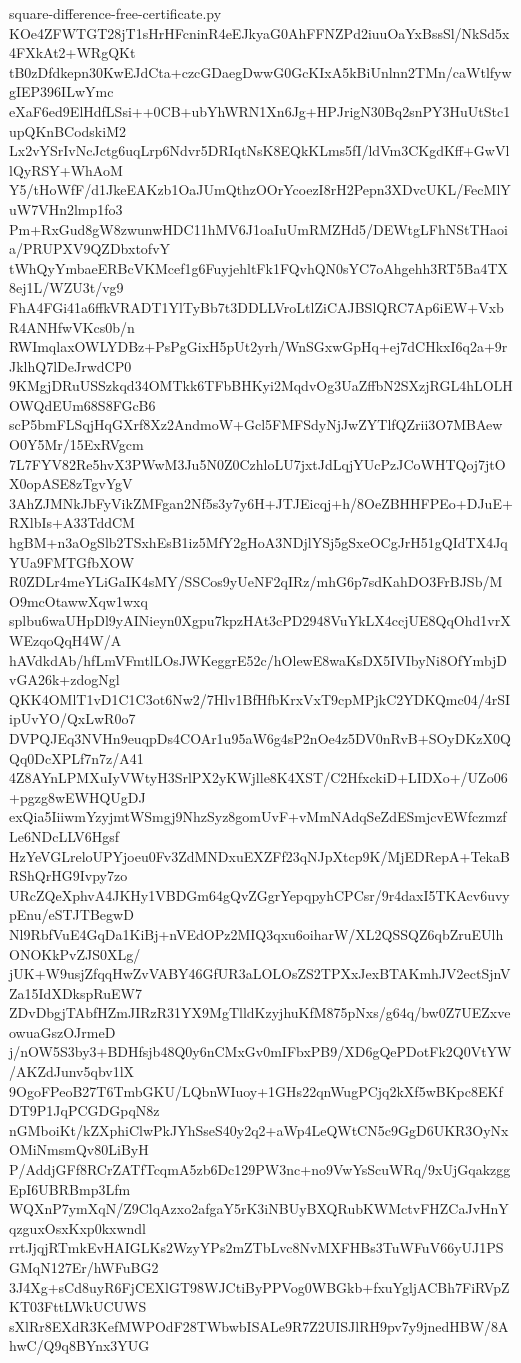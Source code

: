 \documentclass[11pt]{article}
\theoremstyle{definition}
\theoremstyle{remark}
\begin{document}
\begin{filecontents*}[overwrite]{square-difference-free-certificate.py}
KOe4ZFWTGT28jT1sHrHFcninR4eEJkyaG0AhFFNZPd2iuuOaYxBssSl/NkSd5x4FXkAt2+WRgQKt
tB0zDfdkepn30KwEJdCta+czcGDaegDwwG0GcKIxA5kBiUnlnn2TMn/caWtlfywgIEP396ILwYmc
eXaF6ed9ElHdfLSsi++0CB+ubYhWRN1Xn6Jg+HPJrigN30Bq2snPY3HuUtStc1upQKnBCodskiM2
Lx2vYSrIvNcJctg6uqLrp6Ndvr5DRIqtNsK8EQkKLms5fI/ldVm3CKgdKff+GwVllQyRSY+WhAoM
Y5/tHoWfF/d1JkeEAKzb1OaJUmQthzOOrYcoezI8rH2Pepn3XDvcUKL/FecMlYuW7VHn2lmp1fo3
Pm+RxGud8gW8zwunwHDC11hMV6J1oaIuUmRMZHd5/DEWtgLFhNStTHaoia/PRUPXV9QZDbxtofvY
tWhQyYmbaeERBcVKMcef1g6FuyjehltFk1FQvhQN0sYC7oAhgehh3RT5Ba4TX8ej1L/WZU3t/vg9
FhA4FGi41a6ffkVRADT1YlTyBb7t3DDLLVroLtlZiCAJBSlQRC7Ap6iEW+VxbR4ANHfwVKcs0b/n
RWImqlaxOWLYDBz+PsPgGixH5pUt2yrh/WnSGxwGpHq+ej7dCHkxI6q2a+9rJklhQ7lDeJrwdCP0
9KMgjDRuUSSzkqd34OMTkk6TFbBHKyi2MqdvOg3UaZffbN2SXzjRGL4hLOLHOWQdEUm68S8FGcB6
scP5bmFLSqjHqGXrf8Xz2AndmoW+Gcl5FMFSdyNjJwZYTlfQZrii3O7MBAewO0Y5Mr/15ExRVgcm
7L7FYV82Re5hvX3PWwM3Ju5N0Z0CzhloLU7jxtJdLqjYUcPzJCoWHTQoj7jtOX0opASE8zTgvYgV
3AhZJMNkJbFyVikZMFgan2Nf5s3y7y6H+JTJEicqj+h/8OeZBHHFPEo+DJuE+RXlbIs+A33TddCM
hgBM+n3aOgSlb2TSxhEsB1iz5MfY2gHoA3NDjlYSj5gSxeOCgJrH51gQIdTX4JqYUa9FMTGfbXOW
R0ZDLr4meYLiGaIK4sMY/SSCos9yUeNF2qIRz/mhG6p7sdKahDO3FrBJSb/MO9mcOtawwXqw1wxq
splbu6waUHpDl9yAINieyn0Xgpu7kpzHAt3cPD2948VuYkLX4ccjUE8QqOhd1vrXWEzqoQqH4W/A
hAVdkdAb/hfLmVFmtlLOsJWKeggrE52c/hOlewE8waKsDX5IVIbyNi8OfYmbjDvGA26k+zdogNgl
QKK4OMlT1vD1C1C3ot6Nw2/7Hlv1BfHfbKrxVxT9cpMPjkC2YDKQmc04/4rSIipUvYO/QxLwR0o7
DVPQJEq3NVHn9euqpDs4COAr1u95aW6g4sP2nOe4z5DV0nRvB+SOyDKzX0QQq0DcXPLf7n7z/A41
4Z8AYnLPMXuIyVWtyH3SrlPX2yKWjlle8K4XST/C2HfxckiD+LIDXo+/UZo06+pgzg8wEWHQUgDJ
exQia5IiiwmYzyjmtWSmgj9NhzSyz8gomUvF+vMmNAdqSeZdESmjcvEWfczmzfLe6NDcLLV6Hgsf
HzYeVGLreloUPYjoeu0Fv3ZdMNDxuEXZFf23qNJpXtcp9K/MjEDRepA+TekaBRShQrHG9Ivpy7zo
URcZQeXphvA4JKHy1VBDGm64gQvZGgrYepqpyhCPCsr/9r4daxI5TKAcv6uvypEnu/eSTJTBegwD
Nl9RbfVuE4GqDa1KiBj+nVEdOPz2MIQ3qxu6oiharW/XL2QSSQZ6qbZruEUlhONOKkPvZJS0XLg/
jUK+W9usjZfqqHwZvVABY46GfUR3aLOLOsZS2TPXxJexBTAKmhJV2ectSjnVZa15IdXDkspRuEW7
ZDvDbgjTAbfHZmJIRzR31YX9MgTlldKzyjhuKfM875pNxs/g64q/bw0Z7UEZxveowuaGszOJrmeD
j/nOW5S3by3+BDHfsjb48Q0y6nCMxGv0mIFbxPB9/XD6gQePDotFk2Q0VtYW/AKZdJunv5qbv1lX
9OgoFPeoB27T6TmbGKU/LQbnWIuoy+1GHs22qnWugPCjq2kXf5wBKpc8EKfDT9P1JqPCGDGpqN8z
nGMboiKt/kZXphiClwPkJYhSseS40y2q2+aWp4LeQWtCN5c9GgD6UKR3OyNxOMiNmsmQv80LiByH
P/AddjGFf8RCrZATfTcqmA5zb6Dc129PW3nc+no9VwYsScuWRq/9xUjGqakzggEpI6UBRBmp3Lfm
WQXnP7ymXqN/Z9ClqAzxo2afgaY5rK3iNBUyBXQRubKWMctvFHZCaJvHnYqzguxOsxKxp0kxwndl
rrtJjqjRTmkEvHAIGLKs2WzyYPs2mZTbLvc8NvMXFHBs3TuWFuV66yUJ1PSGMqN127Er/hWFuBG2
3J4Xg+sCd8uyR6FjCEXlGT98WJCtiByPPVog0WBGkb+fxuYgljACBh7FiRVpZKT03FttLWkUCUWS
sXlRr8EXdR3KefMWPOdF28TWbwbISALe9R7Z2UISJlRH9pv7y9jnedHBW/8AhwC/Q9q8BYnx3YUG

\end{filecontents*}
\end{document}
